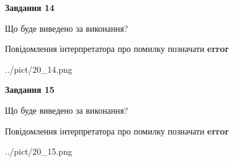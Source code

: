 \documentclass[11pt, ukrainian]{article}
\begin{document}
{\begin {large}
{\begin {center}\textbf{Завдання 14}\end {center}}\par
Що буде виведено за виконання? \par
Повідомлення інтерпретатора про помилку позначати \textbf{error}

\begin{center}
	{../pict/20_14.png}
\end{center}
\newpage

{\begin {center}\textbf{Завдання 15}\end {center}}\par
Що буде виведено за виконання? \par
Повідомлення інтерпретатора про помилку позначати \textbf{error}

\begin{center}
	{../pict/20_15.png}
\end{center}
\newpage

\end {large}}
\end{document}
